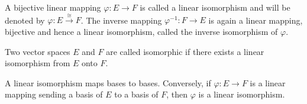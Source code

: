 A bijective linear mapping $\varphi: E \rightarrow F$ is called a linear isomorphism and will be denoted by $\varphi: E \xrightarrow{\cong} F$. The inverse mapping $\varphi^{-1}: F \rightarrow E$ is again a linear mapping, bijective and hence a linear isomorphism, called the inverse isomorphism of $\varphi$.

Two vector spaces $E$ and $F$ are called isomorphic if there exists a linear isomorphism from $E$ onto $F$.

A linear isomorphism maps bases to bases. Conversely, if $\varphi: E \rightarrow F$ is a linear mapping sending a basis of $E$ to a basis of $F$, then $\varphi$ is a linear isomorphism.
